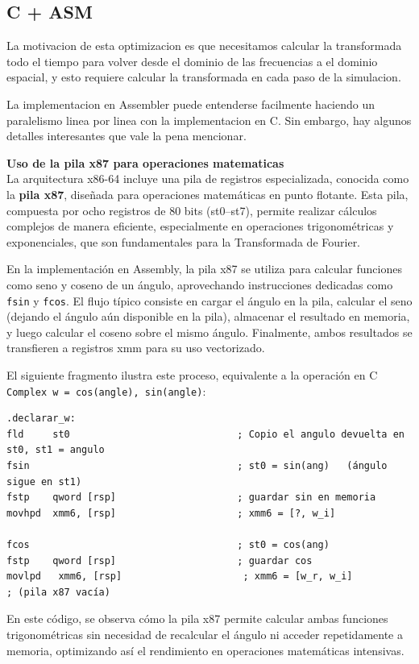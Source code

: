 \documentclass[a4paper]{article}
\begin{document}
\subsection{C + ASM}

La motivacion de esta optimizacion es que necesitamos calcular la transformada todo el tiempo para volver desde el dominio de las frecuencias a el dominio espacial,
y esto requiere calcular la transformada en cada paso de la simulacion.

La implementacion en Assembler puede entenderse facilmente haciendo un paralelismo linea por linea con la implementacion en C. Sin embargo, hay algunos detalles interesantes
que vale la pena mencionar.

\textbf{Uso de la pila x87 para operaciones matematicas}\\
La arquitectura x86-64 incluye una pila de registros especializada, conocida como la \textbf{pila x87}, diseñada para operaciones matemáticas en punto flotante.
Esta pila, compuesta por ocho registros de 80 bits (st0--st7), permite realizar cálculos complejos de manera eficiente, especialmente en operaciones trigonométricas
y exponenciales, que son fundamentales para la Transformada de Fourier.

En la implementación en Assembly, la pila x87 se utiliza para calcular funciones como seno y coseno de un ángulo, aprovechando instrucciones dedicadas como
\texttt{fsin} y \texttt{fcos}. El flujo típico consiste en cargar el ángulo en la pila, calcular el seno (dejando el ángulo aún disponible en la pila), almacenar
el resultado en memoria, y luego calcular el coseno sobre el mismo ángulo. Finalmente, ambos resultados se transfieren a registros xmm para su uso vectorizado.

El siguiente fragmento ilustra este proceso, equivalente a la operación en C \texttt{Complex w = {cos(angle), sin(angle)}}:
\begin{verbatim}    
.declarar_w:
fld     st0                             ; Copio el angulo devuelta en st0, st1 = angulo
fsin                                    ; st0 = sin(ang)   (ángulo sigue en st1)
fstp    qword [rsp]                     ; guardar sin en memoria
movhpd  xmm6, [rsp]                     ; xmm6 = [?, w_i]

fcos                                    ; st0 = cos(ang)
fstp    qword [rsp]                     ; guardar cos
movlpd   xmm6, [rsp]                     ; xmm6 = [w_r, w_i]        
; (pila x87 vacía)
\end{verbatim}
En este código, se observa cómo la pila x87 permite calcular ambas funciones trigonométricas sin necesidad de recalcular el ángulo ni acceder repetidamente a memoria, optimizando así el rendimiento en operaciones matemáticas intensivas.
\end{document}

